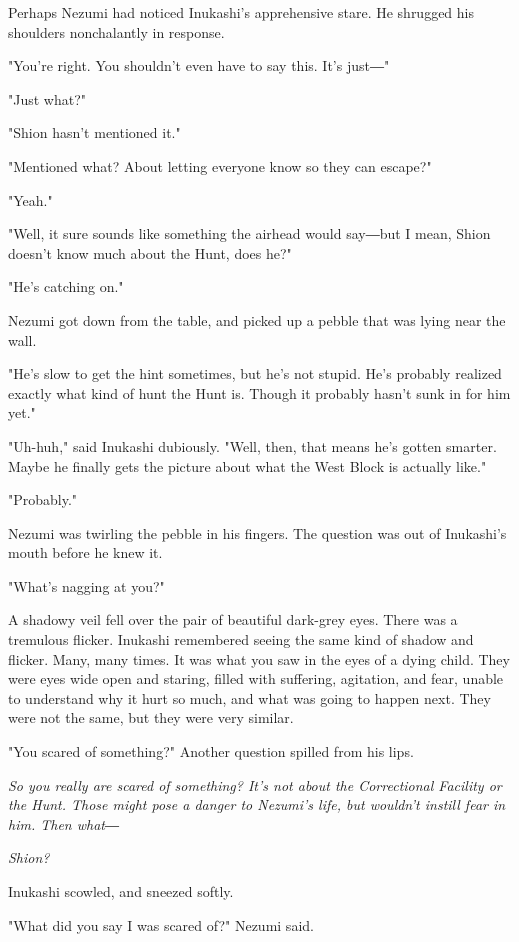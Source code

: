 Perhaps Nezumi had noticed Inukashi's apprehensive stare. He shrugged
his shoulders nonchalantly in response.

"You're right. You shouldn't even have to say this. It's just―"

"Just what?"

"Shion hasn't mentioned it."

"Mentioned what? About letting everyone know so they can escape?"

"Yeah."

"Well, it sure sounds like something the airhead would say―but I mean,
Shion doesn't know much about the Hunt, does he?"

"He's catching on."

Nezumi got down from the table, and picked up a pebble that was lying
near the wall.

"He's slow to get the hint sometimes, but he's not stupid. He's probably
realized exactly what kind of hunt the Hunt is. Though it probably
hasn't sunk in for him yet."

"Uh-huh," said Inukashi dubiously. "Well, then, that means he's gotten
smarter. Maybe he finally gets the picture about what the West Block is
actually like."

"Probably."

Nezumi was twirling the pebble in his fingers. The question was out of
Inukashi's mouth before he knew it.

"What's nagging at you?"

A shadowy veil fell over the pair of beautiful dark-grey eyes. There was
a tremulous flicker. Inukashi remembered seeing the same kind of shadow
and flicker. Many, many times. It was what you saw in the eyes of a
dying child. They were eyes wide open and staring, filled with
suffering, agitation, and fear, unable to understand why it hurt so
much, and what was going to happen next. They were not the same, but
they were very similar.

"You scared of something?" Another question spilled from his lips.

\emph{So you really are scared of something? It's not about the Correctional
Facility or the Hunt. Those might pose a danger to Nezumi's life, but
wouldn't instill fear in him. Then what―}

\emph{Shion?}

Inukashi scowled, and sneezed softly.

"What did you say I was scared of?" Nezumi said.

